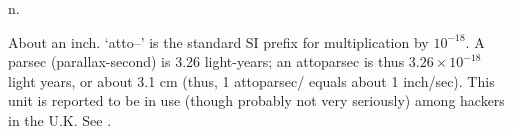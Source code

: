  n.

About an inch. `atto--' is the standard SI prefix for multiplication by $10^{-18}$. A parsec (parallax-second) is 3.26 light-years; an
attoparsec is thus $3.26\times10^{-18}$ light years, or about 3.1 cm (thus, 1 attoparsec/ equals about 1
inch/sec). This unit is reported to be in use (though probably not very seriously) among hackers in the U.K. See .

